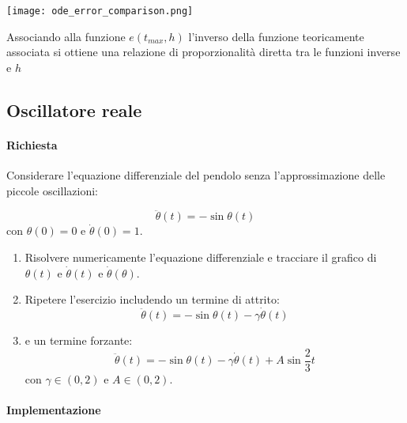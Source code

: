 \begin{enumerate}
	      \begin{marginfigure}
		      \hspace*{-2cm}
		      \texttt{[image: ode\_error\_comparison.png]}
		      \caption{Associando alla funzione $e(t_{max}, h)$ l'inverso della
			      funzione teoricamente associata si ottiene una relazione di
			      proporzionalità diretta tra le funzioni inverse e $h$}
		      \label{fig:error_comparison}
	      \end{marginfigure}





\end{enumerate}



\subsection{Oscillatore reale}

\paragraph{Richiesta}

Considerare l'equazione differenziale del pendolo senza l'approssimazione delle piccole oscillazioni:

\begin{equation}
	\ddot{\theta}(t) = -\sin{\theta(t)}
\end{equation}
con $\theta(0) = 0$ e $\dot{\theta}(0) = 1$.

\begin{enumerate}
	\item Risolvere numericamente l'equazione differenziale e tracciare il grafico di $\theta(t)$ e $\dot{\theta}(t)$ e $\dot{\theta}({\theta})$.
	\item Ripetere l'esercizio includendo un termine di attrito:
	      \[
		      \ddot{\theta}(t) = -\sin{\theta(t)} - \gamma \dot{\theta}(t)
	      \]
	\item e un termine forzante:
	      \[
		      \ddot{\theta}(t) = -\sin{\theta(t)} - \gamma \dot{\theta}(t) + A \sin{\frac{2}{3}t}
	      \]
	      con $\gamma \in (0, 2)$ e $A \in (0, 2)$.

\end{enumerate}

\paragraph{Implementazione}

